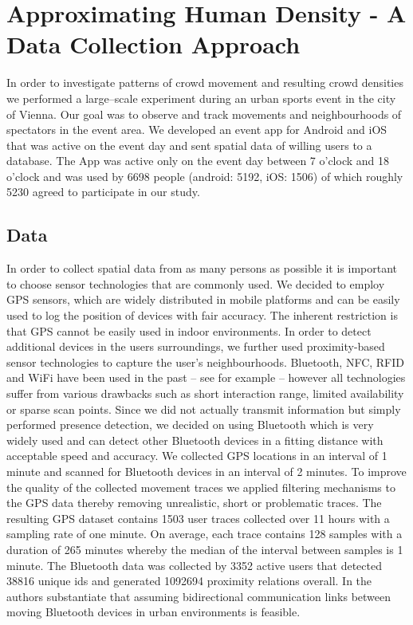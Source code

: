 \documentclass[12pt,a4paper,twoside,openright]{book}
\begin{document}
\section{Approximating Human Density - A Data Collection Approach}
\label{sec:an-approach}

In order to investigate patterns of crowd movement and resulting crowd densities we performed a large--scale experiment during an urban sports event in the city of Vienna.
%
Our goal was to observe and track movements and neighbourhoods of spectators in the event area.
%
We developed an event app for Android and iOS that was active on the event day and sent spatial data of willing users to a database.
%
The App was active only on the event day between 7 o'clock and 18 o'clock and was used by 6698 people (android: 5192, iOS: 1506) of which roughly 5230 agreed to participate in our study.

\subsection{Data}
\label{subsec:data}

In order to collect spatial data from as many persons as possible it is important to choose sensor technologies that are commonly used.
%
We decided to employ GPS sensors, which are widely distributed in mobile platforms and can be easily used to log the position of devices with fair accuracy.
%
The inherent restriction is that GPS cannot be easily used in indoor environments.
%
In order to detect additional devices in the users surroundings, we further used proximity-based sensor technologies to capture the user's neighbourhoods.
%
Bluetooth, NFC, RFID and WiFi have been used in the past -- see for example \cite{Makela2007} -- however all technologies suffer from various drawbacks such as short interaction range, limited availability or sparse scan points.
%
Since we did not actually transmit information but simply performed presence detection, we decided on using Bluetooth which is very widely used and can detect other Bluetooth devices in a fitting distance with acceptable speed and accuracy.
%
We collected GPS locations in an interval of 1 minute and scanned for Bluetooth devices in an interval of 2 minutes.
%
To improve the quality of the collected movement traces we applied filtering mechanisms to the GPS data thereby removing unrealistic, short or problematic traces.
%
The resulting GPS dataset contains 1503 user traces collected over 11 hours with a sampling rate of one minute.
%
On average, each trace contains 128 samples with a duration of 265 minutes whereby the median of the interval between samples is 1 minute.
%
The Bluetooth data was collected by 3352 active users that detected 38816 unique ids and generated 1092694 proximity relations overall.
%
In \cite{Su2006} the authors substantiate that assuming bidirectional communication links between moving Bluetooth devices in urban environments is feasible.
\end{document}
